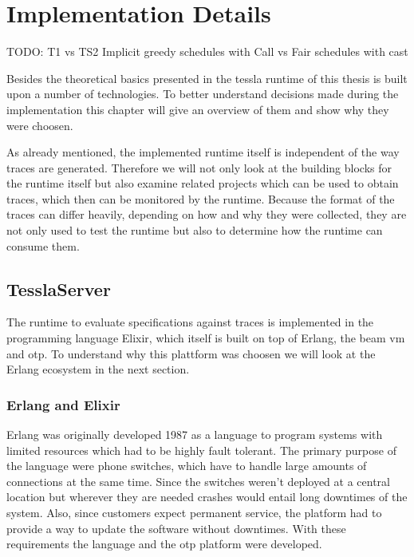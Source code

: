 %
\chapter{Implementation Details}
\label{sec:implementation}

TODO: T1 vs TS2
      Implicit greedy schedules with Call vs Fair schedules with cast

Besides the theoretical basics presented in  the \gls{tessla} runtime of this thesis is built upon a number of technologies.
To better understand decisions made during the implementation this chapter will give an overview of them and show why they were choosen.

As already mentioned, the implemented runtime itself is independent of the way traces are generated.
Therefore we will not only look at the building blocks for the runtime itself but also examine related projects which can be used to obtain traces, which then can be monitored by the runtime.
Because the format of the traces can differ heavily, depending on how and why they were collected, they are not only used to test the runtime but also to determine how the runtime can consume them.

\section{TesslaServer}
\label{sec:implementation:tesslaserver}

The runtime to evaluate specifications against traces is implemented in the programming language Elixir, which itself is built on top of Erlang, the \gls{beam} \gls{vm} and \gls{otp}.
To understand why this plattform was choosen we will look at the Erlang ecosystem in the next section.

\subsection{Erlang and Elixir}
\label{sec:implementation:tesslaserver:erlang_elixir}

Erlang was originally developed 1987 as a language to program systems with limited resources which had to be highly fault tolerant.
The primary purpose of the language were phone switches, which have to handle large amounts of connections at the same time.
Since the switches weren't deployed at a central location but wherever they are needed crashes would entail long downtimes of the system.
Also, since customers expect permanent service, the platform had to provide a way to update the software without downtimes.
With these requirements the language and the \gls{otp} platform were developed.


